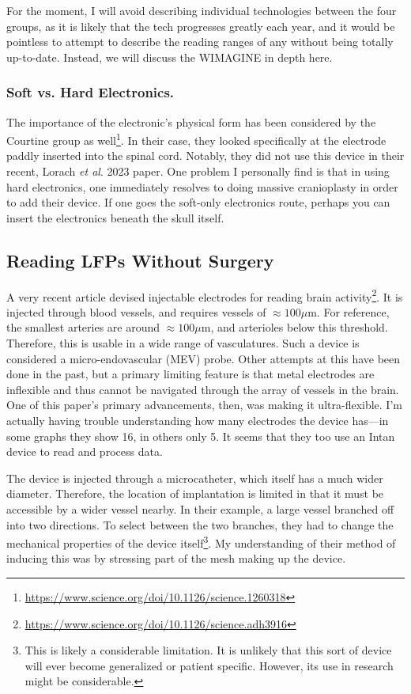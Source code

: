 For the moment, I will avoid describing individual technologies between the four groups, as it is likely that the tech progresses greatly each year, and it would be pointless to attempt to describe the reading ranges of any without being totally up-to-date. Instead, we will discuss the WIMAGINE in depth here.

\subsubsection{Soft vs. Hard Electronics.}
The importance of the electronic's physical form has been considered by the Courtine group as well\footnote{\url{https://www.science.org/doi/10.1126/science.1260318}}. In their case, they looked specifically at the electrode paddly inserted into the spinal cord. Notably, they did not use this device in their recent, Lorach \textit{et al}. 2023 paper. One problem I personally find is that in using hard electronics, one immediately resolves to doing massive cranioplasty in order to add their device. If one goes the soft-only electronics route, perhaps you can insert the electronics beneath the skull itself. 

\subsection{Reading LFPs Without Surgery}

A very recent article devised injectable electrodes for reading brain activity\footnote{\url{https://www.science.org/doi/10.1126/science.adh3916}}. It is injected through blood vessels, and requires vessels of $\approx 100 \mu$m. For reference, the smallest arteries are around $\approx 100 \mu$m, and arterioles below this threshold. Therefore, this is usable in a wide range of vasculatures. Such a device is considered a micro-endovascular (MEV) probe. Other attempts at this have been done in the past, but a primary limiting feature is that metal electrodes are inflexible and thus cannot be navigated through the array of vessels in the brain. One of this paper's primary advancements, then, was making it ultra-flexible. I'm actually having trouble understanding how many electrodes the device has---in some graphs they show 16, in others only 5. It seems that they too use an Intan device to read and process data.\newline

The device is injected through a microcatheter, which itself has a much wider diameter. Therefore, the location of implantation is limited in that it must be accessible by a wider vessel nearby. In their example, a large vessel branched off into two directions. To select between the two branches, they had to change the mechanical properties of the device itself\footnote{This is likely a considerable limitation. It is unlikely that this sort of device will ever become generalized or patient specific. However, its use in research might be considerable.}. My understanding of their method of inducing this was by stressing part of the mesh making up the device.\newline

